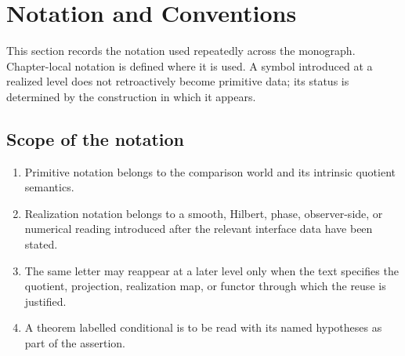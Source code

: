 \chapter*{Notation and Conventions}
{}
\label{ch:notation-conventions}
This section records the notation used repeatedly across the monograph.
Chapter-local notation is defined where it is used.  A symbol introduced
at a realized level does not retroactively become primitive data; its
status is determined by the construction in which it appears.

\section*{Scope of the notation}
\begin{enumerate}[label=\textup{(\roman*)}]
\item Primitive notation belongs to the comparison world and its
intrinsic quotient semantics.
\item Realization notation belongs to a smooth, Hilbert, phase,
observer-side, or numerical reading introduced after the relevant
interface data have been stated.
\item The same letter may reappear at a later level only when the text
specifies the quotient, projection, realization map, or functor through
which the reuse is justified.
\item A theorem labelled conditional is to be read with its named
hypotheses as part of the assertion.
\end{enumerate}

